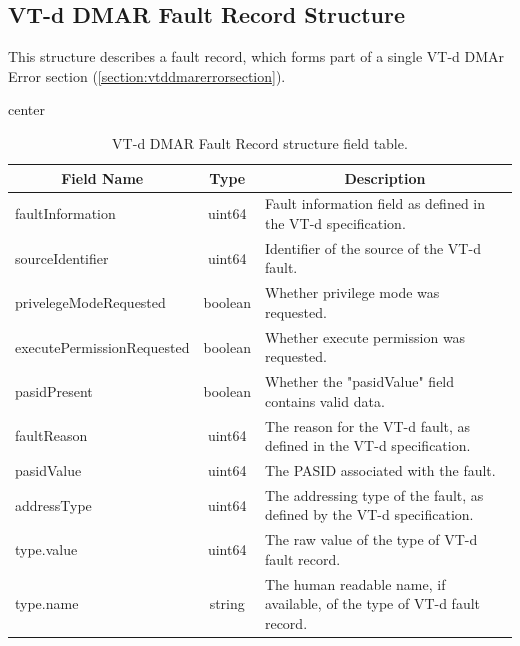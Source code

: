 \documentclass{report}
\newcommand*{\thead}[1]{\multicolumn{1}{|c|}{\bfseries #1}}
\newcommand*{\jsontable}[1]{
    \begin{table}[!ht]
    \label{#1}
    \centering
    \begin{adjustbox}{center}
    \begin{tabular}{|l|c|p{8cm}|}
    \hline
    \thead{Field Name} & \thead{Type} & \thead{Description} \\
    \hline
}
\newcommand*{\jsontableend}[1]{
    \hline
    \end{tabular}
    \end{adjustbox}
    \caption{#1}
    \label{table:#1}
    \end{table}
    \FloatBarrier
}
\begin{document}
\subsection{VT-d DMAR Fault Record Structure}
\label{subsection:vtddmarfaultrecordstructure}
This structure describes a fault record, which forms part of a single VT-d DMAr Error section (\ref{section:vtddmarerrorsection}).
\jsontable{table:vtddmarfaultrecordstructure}
faultInformation & uint64 & Fault information field as defined in the VT-d specification.\\
\hline
sourceIdentifier & uint64 & Identifier of the source of the VT-d fault.\\
\hline
privelegeModeRequested & boolean & Whether privilege mode was requested.\\
\hline
executePermissionRequested & boolean & Whether execute permission was requested.\\
\hline
pasidPresent & boolean & Whether the "pasidValue" field contains valid data.\\
\hline
faultReason & uint64 & The reason for the VT-d fault, as defined in the VT-d specification.\\
\hline
pasidValue & uint64 & The PASID associated with the fault.\\
\hline
addressType & uint64 & The addressing type of the fault, as defined by the VT-d specification.\\
\hline
type.value & uint64 & The raw value of the type of VT-d fault record.\\
type.name & string & The human readable name, if available, of the type of VT-d fault record.\\
\jsontableend{VT-d DMAR Fault Record structure field table.}

\end{document}
